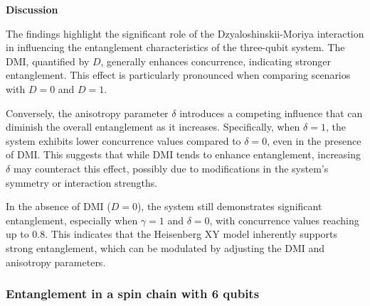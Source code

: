 \newpage
\textbf{Discussion}

The findings highlight the significant role of the Dzyaloshinskii-Moriya interaction in influencing the entanglement characteristics of the three-qubit system. The DMI, quantified by \(D\), generally enhances concurrence, indicating stronger entanglement. This effect is particularly pronounced when comparing scenarios with \(D = 0\) and \(D = 1\).

Conversely, the anisotropy parameter \(\delta\) introduces a competing influence that can diminish the overall entanglement as it increases. Specifically, when \(\delta = 1\), the system exhibits lower concurrence values compared to \(\delta = 0\), even in the presence of DMI. This suggests that while DMI tends to enhance entanglement, increasing \(\delta\) may counteract this effect, possibly due to modifications in the system's symmetry or interaction strengths.

In the absence of DMI (\(D = 0\)), the system still demonstrates significant entanglement, especially when \(\gamma = 1\) and \(\delta = 0\), with concurrence values reaching up to 0.8. This indicates that the Heisenberg XY model inherently supports strong entanglement, which can be modulated by adjusting the DMI and anisotropy parameters.




\newpage
\subsubsection{Entanglement in a spin chain with 6 qubits}

